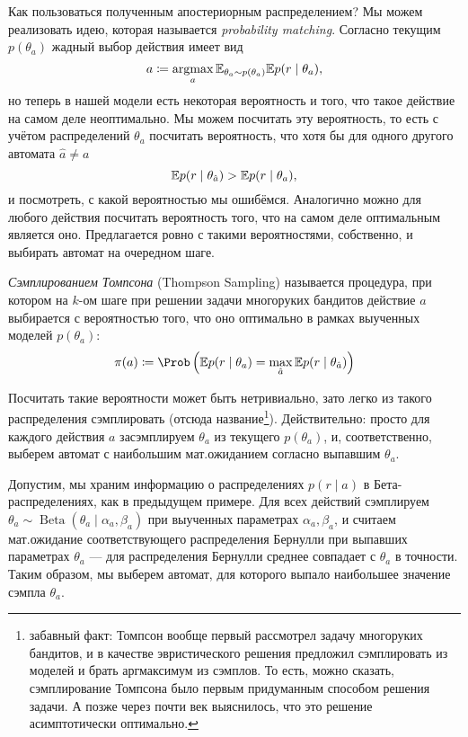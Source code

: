 Как пользоваться полученным апостериорным распределением? Мы можем реализовать идею, которая называется \emph{probability matching}. Согласно текущим $p(\theta_a)$ жадный выбор действия имеет вид
$$a \HM\coloneqq \argmax_a \E_{\theta_a \sim p(\theta_a)} \E p(r \mid \theta_a),$$
но теперь в нашей модели есть некоторая вероятность и того, что такое действие на самом деле неоптимально. Мы можем посчитать эту вероятность, то есть с учётом распределений $\theta_a$ посчитать вероятность, что хотя бы для одного другого автомата $\hat{a} \ne a$
$$\mathbb{E} p(r \mid \theta_{\hat{a}}) > \mathbb{E} p(r \mid \theta_{a}),$$
и посмотреть, с какой вероятностью мы ошибёмся. Аналогично можно для любого действия посчитать вероятность того, что на самом деле оптимальным является оно. Предлагается ровно с такими вероятностями, собственно, и выбирать автомат на очередном шаге.

\begin{definition}
\emph{Сэмплированием Томпсона} (Thompson Sampling) называется процедура, при котором на $k$-ом шаге при решении задачи многоруких бандитов действие $a$ выбирается с вероятностью того, что оно оптимально в рамках выученных моделей $p(\theta_a)$:
$$\pi(a) \coloneqq \Prob \left( \E p(r \mid \theta_a) = \max_{\hat{a}} \E p(r \mid \theta_{\hat{a}}) \right)$$
\end{definition}

Посчитать такие вероятности может быть нетривиально, зато легко из такого распределения сэмплировать (отсюда название\footnote{забавный факт: Томпсон вообще первый рассмотрел задачу многоруких бандитов, и в качестве эвристического решения предложил сэмплировать из моделей и брать аргмаксимум из сэмплов. То есть, можно сказать, сэмплирование Томпсона было первым придуманным способом решения задачи. А позже через почти век выяснилось, что это решение асимптотически оптимально.}). Действительно: просто для каждого действия $a$ засэмплируем $\theta_a$ из текущего $p(\theta_a)$, и, соответственно, выберем автомат с наибольшим мат.ожиданием согласно выпавшим $\theta_a$. 

\begin{example}
Допустим, мы храним информацию о распределениях $p(r \mid a)$ в Бета-распределениях, как в предыдущем примере. Для всех действий сэмплируем $\theta_a \sim \operatorname{Beta}(\theta_a \mid \alpha_a, \beta_a)$ при выученных параметрах $\alpha_a, \beta_a$, и считаем мат.ожидание соответствующего распределения Бернулли при выпавших параметрах $\theta_a$ --- для распределения Бернулли среднее совпадает с $\theta_a$ в точности. Таким образом, мы выберем автомат, для которого выпало наибольшее значение сэмпла $\theta_a$.
\end{example}

